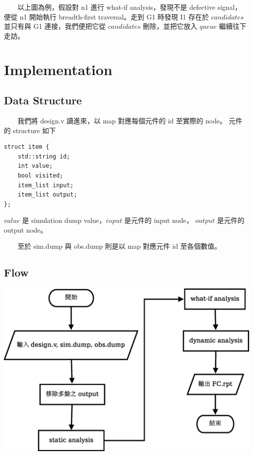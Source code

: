 \documentclass[12pt,a4paper]{article}
\begin{document}
　　以上圖為例，假設對 n1 進行 what-if analysis，發現不是 defective signal，%
便從 n1 開始執行 breadth-first traversal。走到 G1 時發現 I1 存在於 $candidates$ %
並只有與 G1 連接，我們便把它從 $candidates$ 刪除，並把它放入 $queue$ 繼續往下走訪。

\section{Implementation}

\subsection{Data Structure}

　　我們將 design.v 讀進來，以 map 對應每個元件的 id 至實際的 node。%
元件的 structure 如下

\begin{verbatim}
struct item {
    std::string id;
    int value;
    bool visited;
    item_list input;
    item_list output;
};
\end{verbatim}

$value$ 是 simulation dump value，$input$ 是元件的 input node，%
$output$ 是元件的 output node。

　　至於 sim.dump 與 obs.dump 則是以 map 對應元件 id 至各個數值。

\subsection{Flow}

\begin{center}
\includegraphics[scale=0.6]{imgs/03.eps}
\end{center}
\end{document}

